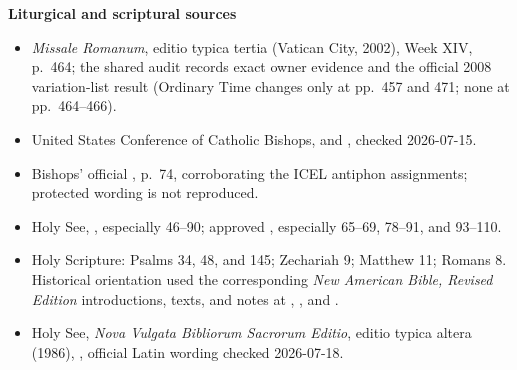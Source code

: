 \begin{deepstudy}
\textbf{Liturgical and scriptural sources}
{\footnotesize
\begin{itemize}[itemsep=0em,topsep=0.15em,parsep=0pt]
\item \emph{Missale Romanum}, editio typica tertia (Vatican City, 2002), Week XIV, p.~464; the shared audit records exact owner evidence and the official 2008 variation-list result (Ordinary Time changes only at pp.~457 and 471; none at pp.~464--466).
\item United States Conference of Catholic Bishops,  and , checked 2026-07-15.
\item Bishops' official , p.~74, corroborating the ICEL antiphon assignments; protected wording is not reproduced.
\item Holy See, , especially 46--90; approved , especially 65--69, 78--91, and 93--110.
\item Holy Scripture: Psalms 34, 48, and 145; Zechariah 9; Matthew 11; Romans 8. Historical orientation used the corresponding \emph{New American Bible, Revised Edition} introductions, texts, and notes at , , and .
\item Holy See, \emph{Nova Vulgata Bibliorum Sacrorum Editio}, editio typica altera (1986), , official Latin wording checked 2026-07-18.
\end{itemize}}


\end{deepstudy}
